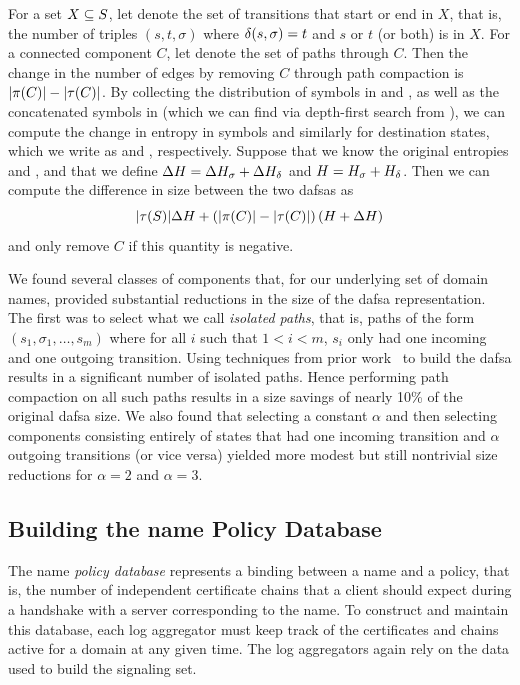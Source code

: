 For a set $X \subseteq S$, let  denote the set of transitions
that start or end in $X$, that is, the number of triples $(s, t, \sigma)$ where
$\delta(s, \sigma) = t$ and $s$ or $t$ (or both) is in $X$. For a connected
component $C$, let  denote the set of paths through $C$. Then the
change in the number of edges by removing $C$ through path compaction is
$|\pi(C)| - |\tau(C)|$. By collecting the distribution of symbols in
 and , as well as the concatenated symbols in
 (which we can find via depth-first search from ), we
can compute the change in entropy in symbols and similarly for destination
states, which we write as \symboldh and \destdh, respectively. Suppose that we know the
original entropies \symbolh and \desth, and that we define $\Delta H = \Delta H_\sigma +
\Delta H_\delta$ and $H = H_\sigma + H_\delta$. Then we can compute the difference in
size between the two \acp{dafsa} as
\begin{equation}
  |\tau(S)| \Delta H + \left(|\pi(C)| - |\tau(C)|\right)
  (H + \Delta H)
\end{equation}
and only remove $C$ if this quantity is negative.

We found several classes of components that, for our underlying set of domain
names, provided substantial reductions in the size of the \ac{dafsa}
representation. The first was to select what we call \emph{isolated paths}, that
is, paths of the form $(s_1, \sigma_1, \ldots, s_m)$ where for all $i$ such that
$1 < i < m$, $s_i$ only had one incoming and one outgoing transition. Using
techniques from prior work~\cite{daciuk2000incremental} to build the \ac{dafsa}
results in a significant number of isolated paths. Hence performing path
compaction on all such paths results in a size savings of nearly 10\% of the
original \ac{dafsa} size. We also found that selecting a constant $\alpha$ and
then selecting components consisting entirely of states that had one incoming
transition and $\alpha$ outgoing transitions (or vice versa) yielded more modest
but still nontrivial size reductions for $\alpha = 2$ and $\alpha = 3$.

\subsection{Building the \ac{name} Policy Database}
\label{sec:design:policy}

The \ac{name} \emph{policy database} represents a binding between a name and a policy, that
is, the number of independent certificate chains that a client
should expect during a handshake with a server corresponding to the name.
To construct and maintain this database, each log aggregator must keep track of
the certificates and chains active for a domain at any given time. The log
aggregators again rely on the data used to build the signaling set.

